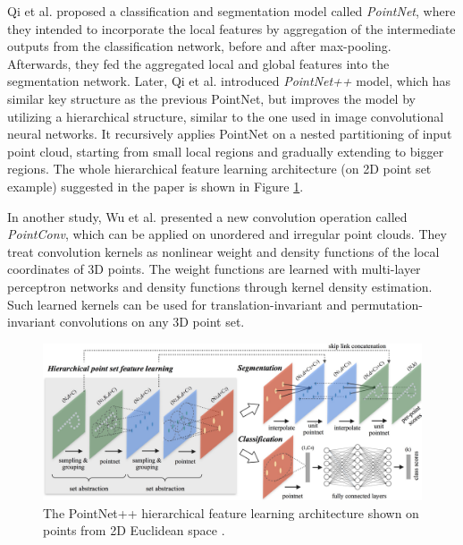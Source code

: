 \noindent Qi et al. \cite{DBLP:journals/corr/QiSMG16} proposed a classification and segmentation model called \textit{PointNet}, where they intended to incorporate the local features by aggregation of the intermediate outputs from the classification network, before and after max-pooling. Afterwards, they fed the aggregated local and global features into the segmentation network. Later, Qi et al. \cite{DBLP:journals/corr/QiYSG17} introduced \textit{PointNet++} model, which has similar key structure as the previous PointNet, but improves the model by utilizing a hierarchical structure, similar to the one used in image convolutional neural networks. It recursively applies PointNet on a nested partitioning of input point cloud, starting from small local regions and gradually extending to bigger regions. The whole hierarchical feature learning architecture (on 2D point set example) suggested in the paper is shown in Figure \ref{fig:Pointnet2}. \par

\vspace{5mm}

\noindent In another study, Wu et al. \cite{DBLP:journals/corr/abs-1811-07246} presented a new convolution operation called \textit{PointConv}, which can be applied on unordered and irregular point clouds. They treat convolution kernels as nonlinear weight and density functions of the local coordinates of 3D points. The weight functions are learned with multi-layer perceptron networks and density functions through kernel density estimation. Such learned kernels can be used for translation-invariant and permutation-invariant convolutions on any 3D point set. \par
\vspace{5mm}
\begin{figure}[H]
\begin{center}
  \includegraphics[width=\textwidth]{images/related_work/pointnet2.jpg}
  \caption[The PointNet++ hierarchical feature learning architecture \cite{DBLP:journals/corr/QiYSG17}.]{The PointNet++ hierarchical feature learning architecture shown on points from 2D Euclidean space \cite{DBLP:journals/corr/QiYSG17}.}
  \label{fig:Pointnet2}
\end{center}
\end{figure}

